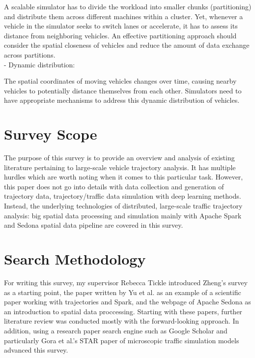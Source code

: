 \documentclass[11pt]{uonthesis}
\begin{document}
A scalable simulator has to divide the workload into smaller chunks (partitioning) and distribute them across different machines within a cluster. Yet, whenever a vehicle in the simulator seeks to switch lanes or accelerate, it has to assess its distance from neighboring vehicles. An effective partitioning approach should consider the spatial closeness of vehicles and reduce the amount of data exchange across partitions.
\\
\noindent- Dynamic distribution:

The spatial coordinates of moving vehicles changes over time, causing nearby vehicles to potentially distance themselves from each other. Simulators need to have appropriate mechanisms to address this dynamic distribution of vehicles. 

\section{Survey Scope}
The purpose of this survey is to provide an overview and analysis of existing literature pertaining to large-scale vehicle trajectory analysis. It has multiple hurdles which are worth noting when it comes to this particular task. However, this paper does not go into details with data collection and generation of trajectory data, trajectory/traffic data simulation with deep learning methods. Instead, the underlying technologies of distributed, large-scale traffic trajectory analysis: big spatial data processing and simulation mainly with Apache Spark and Sedona spatial data pipeline are covered in this survey.

\section{Search Methodology} 

For writing this survey, my supervisor Rebecca Tickle introduced Zheng's survey\cite{zheng2015trajectory} as a starting point, the paper written by Yu et al.\cite{yu2020dissecting} as an example of a scientific paper working with trajectories and Spark, and the webpage of Apache Sedona\cite{sedona} as an introduction to spatial data proccessing. Starting with these papers, further literature review was conducted mostly with the forward-looking approach. In addition, using a research paper search engine such as Google Scholar and particularly Gora et al.'s STAR paper of microscopic traffic simulation models\cite{gora2020microscopic} advanced this survey.
\end{document}
